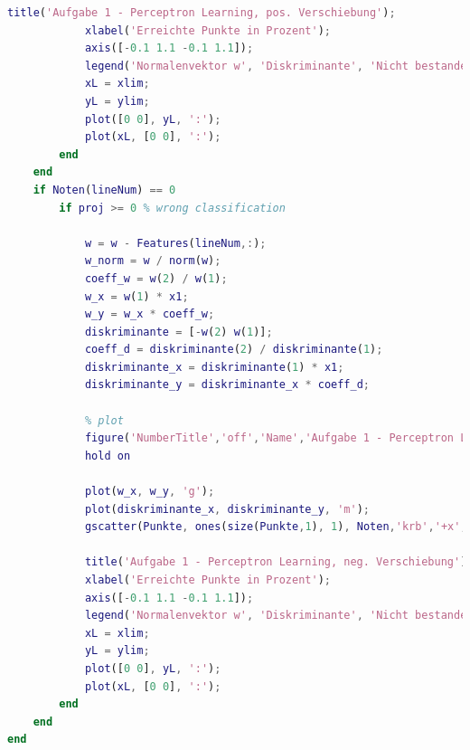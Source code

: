 \documentclass[12pt]{article}
\begin{document}
\begin{lstlisting}[language=Matlab]
            title('Aufgabe 1 - Perceptron Learning, pos. Verschiebung');
            xlabel('Erreichte Punkte in Prozent');
            axis([-0.1 1.1 -0.1 1.1]);
            legend('Normalenvektor w', 'Diskriminante', 'Nicht bestanden','Bestanden');
            xL = xlim;
            yL = ylim;
            plot([0 0], yL, ':');
            plot(xL, [0 0], ':');
        end
    end
    if Noten(lineNum) == 0
        if proj >= 0 % wrong classification
            
            w = w - Features(lineNum,:);
            w_norm = w / norm(w);
            coeff_w = w(2) / w(1);
            w_x = w(1) * x1;
            w_y = w_x * coeff_w;
            diskriminante = [-w(2) w(1)];
            coeff_d = diskriminante(2) / diskriminante(1);
            diskriminante_x = diskriminante(1) * x1;
            diskriminante_y = diskriminante_x * coeff_d;
            
            % plot
            figure('NumberTitle','off','Name','Aufgabe 1 - Perceptron Learning');
            hold on
            
            plot(w_x, w_y, 'g');
            plot(diskriminante_x, diskriminante_y, 'm');
            gscatter(Punkte, ones(size(Punkte,1), 1), Noten,'krb','+x',[],'off');
                   
            title('Aufgabe 1 - Perceptron Learning, neg. Verschiebung');
            xlabel('Erreichte Punkte in Prozent');
            axis([-0.1 1.1 -0.1 1.1]);
            legend('Normalenvektor w', 'Diskriminante', 'Nicht bestanden', 'Bestanden');
            xL = xlim;
            yL = ylim;
            plot([0 0], yL, ':');
            plot(xL, [0 0], ':');
        end
    end
end
\end{lstlisting}
\end{document}

